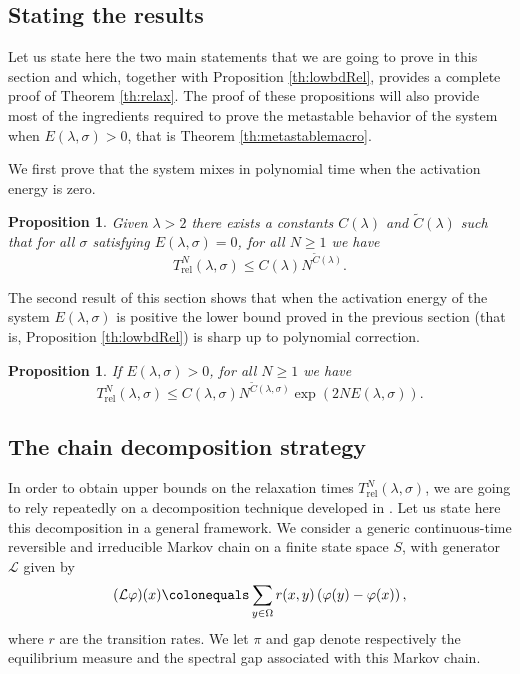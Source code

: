 \documentclass[reqno,11pt]{amsart}
\numberwithin{equation}{section}
\newcommand{\gO}{\Omega}
\newcommand{\gl}{\lambda}
\newcommand{\gs}{\sigma}
\newcommand{\cL}{{\ensuremath{\mathcal L}} }
\newtheorem{proposition}[theorem]{Proposition}
\newcommand{\Gap}{\mathrm{gap}}
\newcommand{\Rel}{\mathrm{rel}}
\renewcommand{\tilde}{\widetilde}
\begin{document}
\subsection{Stating the results}

Let us state here the two main statements that we are going to prove in this section and which,
together with Proposition \ref{th:lowbdRel}, provides a complete proof of Theorem \ref{th:relax}.
The proof of these propositions will also provide most of the ingredients required to prove the metastable behavior of the system when $E(\gl,\sigma)>0$, that is Theorem \ref{th:metastablemacro}.


\medskip


\noindent We first prove that the system mixes in polynomial time when the activation energy is zero.


\begin{proposition}\label{th:upreltimestable}
Given $\gl>2$ there exists a constants $C(\gl)$ and $\tilde C(\gl)$ such that for all $\sigma$ satisfying 
$E(\gl,\sigma)=0$, for all $N\ge 1$ we have
\begin{equation}
T_{\Rel}^N(\gl, \gs) \le C(\gl) N^{\tilde C(\gl)}.
\end{equation}
\end{proposition} 

 The second result of this section shows that when the activation energy of the system $E(\gl,\sigma)$ is positive the lower bound proved
in the previous section (that is, Proposition \ref{th:lowbdRel}) is sharp up to polynomial correction.


\begin{proposition}\label{th:upreltimebottleneck}
If $E(\gl,\gs)>0$, for all $N \ge 1$ we have
\begin{equation}
T_{\Rel}^N(\gl, \gs) \le  C(\gl, \gs) N^{\tilde C(\gl, \gs)} \exp(2N E(\gl, \gs)).
\end{equation}
\end{proposition}


 \subsection{The chain decomposition strategy} \label{sec:decompstrat}
 In order to  obtain upper bounds on the relaxation times $T_{\Rel}^N(\gl,\gs)$, 
 we are going to rely repeatedly on a decomposition technique developed in \cite{jerrum2004elementary}.
 Let us state here this decomposition in a general framework. We consider a generic continuous-time 
 reversible and irreducible Markov chain on a finite state space $S$, with generator $\cL$ given by
 \begin{equation}
( \cL \varphi)(x) \colonequals \sum_{y \in \gO}  r(x,y) \left( \varphi (y)-\varphi (x) \right),
\end{equation}
where $r$ are the transition rates.
 We let $\pi$ and $\Gap$ denote respectively the equilibrium measure and the spectral gap associated with this Markov chain.
 
\end{document}

